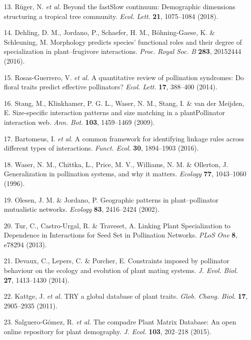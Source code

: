 \documentclass[12pt,a4paper,]{article}
\begin{document}
\hypertarget{ref-ruger2018}{}
13. Rüger, N. \emph{et al.} Beyond the fastSlow continuum: Demographic
dimensions structuring a tropical tree community. \emph{Ecol. Lett.}
\textbf{21}, 1075--1084 (2018).

\hypertarget{ref-dehling2016}{}
14. Dehling, D. M., Jordano, P., Schaefer, H. M., Böhning-Gaese, K. \&
Schleuning, M. Morphology predicts species' functional roles and their
degree of specialization in plant--frugivore interactions. \emph{Proc.
Royal Soc. B} \textbf{283}, 20152444 (2016).

\hypertarget{ref-rosas2014}{}
15. Rosas-Guerrero, V. \emph{et al.} A quantitative review of
pollination syndromes: Do floral traits predict effective pollinators?
\emph{Ecol. Lett.} \textbf{17}, 388--400 (2014).

\hypertarget{ref-stang2009}{}
16. Stang, M., Klinkhamer, P. G. L., Waser, N. M., Stang, I. \& van der
Meijden, E. Size-specific interaction patterns and size matching in a
plantPollinator interaction web. \emph{Ann. Bot.} \textbf{103},
1459--1469 (2009).

\hypertarget{ref-bartomeus2016}{}
17. Bartomeus, I. \emph{et al.} A common framework for identifying
linkage rules across different types of interactions. \emph{Funct.
Ecol.} \textbf{30}, 1894--1903 (2016).

\hypertarget{ref-waser1996}{}
18. Waser, N. M., Chittka, L., Price, M. V., Williams, N. M. \&
Ollerton, J. Generalization in pollination systems, and why it matters.
\emph{Ecology} \textbf{77}, 1043--1060 (1996).

\hypertarget{ref-olesen2002}{}
19. Olesen, J. M. \& Jordano, P. Geographic patterns in
plant--pollinator mutualistic networks. \emph{Ecology} \textbf{83},
2416--2424 (2002).

\hypertarget{ref-tur2013}{}
20. Tur, C., Castro-Urgal, R. \& Traveset, A. Linking Plant
Specialization to Dependence in Interactions for Seed Set in Pollination
Networks. \emph{PLoS One} \textbf{8}, e78294 (2013).

\hypertarget{ref-devaux2014}{}
21. Devaux, C., Lepers, C. \& Porcher, E. Constraints imposed by
pollinator behaviour on the ecology and evolution of plant mating
systems. \emph{J. Evol. Biol.} \textbf{27}, 1413--1430 (2014).

\hypertarget{ref-kattge2011}{}
22. Kattge, J. \emph{et al.} TRY a global database of plant traits.
\emph{Glob. Chang. Biol.} \textbf{17}, 2905--2935 (2011).

\hypertarget{ref-salguero2015}{}
23. Salguero-Gómez, R. \emph{et al.} The compadre Plant Matrix Database:
An open online repository for plant demography. \emph{J. Ecol.}
\textbf{103}, 202--218 (2015).
\end{document}
